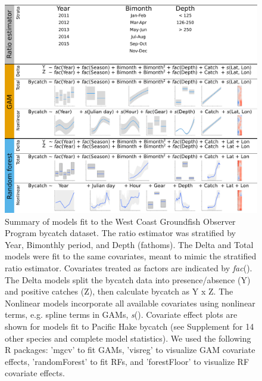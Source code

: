 \documentclass[]{article}
\begin{document}
\begin{figure}

{\centering \includegraphics[width=170mm]{../../figures/model_descriptions} 

}

\caption{Summary of models fit to the West Coast Groundfish Observer Program bycatch dataset. The ratio estimator was stratified by Year, Bimonthly period, and Depth (fathoms). The Delta and Total models were fit to the same covariates, meant to mimic the stratified ratio estimator. Covariates treated as factors are indicated by \textit{fac}(). The Delta models split the bycatch data into presence/absence (Y) and positive catches (Z), then calculate bycatch as Y x Z. The Nonlinear models incorporate all available covariates using nonlinear terms, e.g. spline terms in GAMs, \textit{s}(). Covariate effect plots are shown for models fit to Pacific Hake bycatch (see Supplement for 14 other species and complete model statistics). We used the following R packages: 'mgcv' to fit GAMs, 'visreg' to visualize GAM covariate effects, 'randomForest' to fit RFs, and 'forestFloor' to visualize RF covariate effects.}\label{fig:model-descriptions}
\end{figure}

\pagebreak
\end{document}
